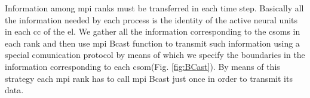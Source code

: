 \documentclass[11pt,a4paper]{article}
\begin{document}

Information among \gls{mpi} ranks must be transferred in each time step. Basically all the information needed by each process is the identity of the active neural units in each \gls{cc} of the \gls{el}. We gather all the information corresponding to the \glspl{csom} in each rank and then use \gls{mpi} Bcast function to transmit such information using a special comunication protocol by means of which we specify the boundaries in the information corresponding to each \gls{csom}(Fig. \ref{fig:BCast}). By means of this strategy each \gls{mpi} rank has to call \gls{mpi} Bcast just once in order to transmit its data.
\end{document}
